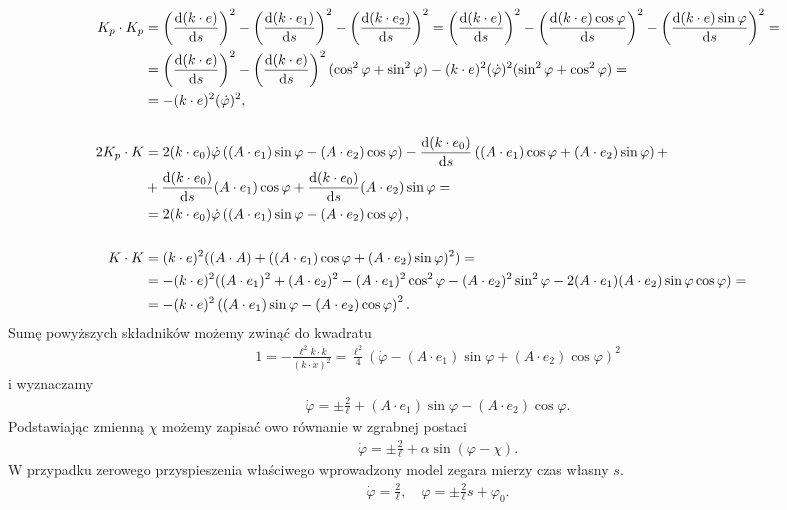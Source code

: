 \begin{align*}
K_p\cdot K_p &= \left(  \frac{\text{d} (k\cdot e)}{\text{d} s} \right)^2 
		- \left( \frac{\text{d} (k\cdot e_1)}{\text{d} s} \right)^2 
		- \left( \frac{\text{d} (k\cdot e_2)}{\text{d} s} \right)^2 
		= \left(  \frac{\text{d} (k\cdot e)}{\text{d} s} \right)^2 
		- \left( \frac{\text{d} (k\cdot e)\cos\varphi}{\text{d} s} \right)^2 
		- \left( \frac{\text{d} (k\cdot e)\sin\varphi}{\text{d} s} \right)^2 =
	\\ &= \left(  \frac{\text{d} (k\cdot e)}{\text{d} s} \right)^2 
		- \left( \frac{\text{d} (k\cdot e)}{\text{d} s} 
            \right)^2 (\cos^2\varphi + \sin^2\varphi)
		- (k\cdot e)^2  (\dot{\varphi} )^2 (\sin^2\varphi + \cos^2\varphi) =
	\\ &= - (k\cdot e)^2  (\dot{\varphi} )^2 ,
	\\
	\\
2K_p\cdot K &= 2(k\cdot e_0 ) \dot{\varphi} \left( (A\cdot e_1) 
                \sin\varphi -(A\cdot e_2) \cos\varphi \right) 
        -\frac{\text{d}(k\cdot e_0)}{\text{d} s} \left((A\cdot e_1)\cos\varphi + 
                (A\cdot e_2) \sin\varphi \right)+
    \\ &+\frac{\text{d}(k\cdot e_0)}{\text{d} s} (A\cdot e_1)\cos\varphi 
        +\frac{\text{d}(k\cdot e_0)}{\text{d} s} (A\cdot e_2)\sin\varphi =
    \\ &=2(k\cdot e_0 ) \dot{\varphi} \left( (A\cdot e_1) \sin\varphi -
                (A\cdot e_2) \cos\varphi \right) , 
	\\
	\\
K\cdot K &= (k\cdot e)^2 ( (A\cdot A ) +( \left(A\cdot e_1\right)\cos\varphi+
                    \left(A\cdot e_2\right)\sin\varphi )^2) =
    \\   &=- (k\cdot e)^2( (A\cdot e_1 )^2 + (A\cdot e_2)^2 -
                    (A\cdot e_1)^2\cos^2\varphi - (A\cdot e_2)^2\sin^2\varphi
            - 2 (A\cdot e_1) (A\cdot e_2) \sin\varphi\cos\varphi ) =
    \\   &=- (k\cdot e)^2\left( (A\cdot e_1) \sin\varphi -
                    (A\cdot e_2) \cos\varphi \right)^2 .
\end{align*}
Sumę powyższych składników możemy zwinąć do kwadratu 
\begin{align*}
1 = -\frac{\ell^2\dot{k}\cdot \dot{k}}{(k\cdot \dot{x})^2}  =
\frac{\ell^2}{4} 
( \dot{\varphi} -(A\cdot e_1) \sin\varphi +(A\cdot e_2) \cos\varphi )^2 
\end{align*}
i wyznaczamy
\begin{align*}
\dot{\varphi} = \pm \frac{2}{\ell} +
(A\cdot e_1) \sin\varphi - (A\cdot e_2) \cos\varphi .
\end{align*}
Podstawiając zmienną $\chi$ możemy zapisać owo równanie w 
zgrabnej postaci
\begin{align}\label{phi_equation}
\boxed{
\dot{\varphi}   = \pm \frac{2}{\ell} +\alpha \sin ( \varphi -\chi ) .
}
\end{align}
W przypadku zerowego przyspieszenia właściwego 
wprowadzony model zegara mierzy czas własny $s$.
\begin{align}
\dot{\varphi} = \frac{2}{\ell},\quad
\varphi =\pm \frac{2}{\ell} s + \varphi_0.
\end{align}
